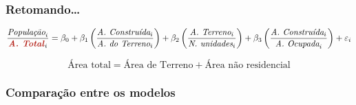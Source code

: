 \documentclass[%
    8pt, 
    aspectratio=169,
]{beamer}
\begin{document}
\begin{frame}
    \frametitle{Retomando\dots}
    \begin{equation*}
        \frac{\textit{População}_i}{\textcolor{BrickRed}{\textbf{\textit{A. Total}}}_i}
        =\beta_0
        +\beta_1\left(\frac{\textit{A. Construída}_i}{\textit{A. do Terreno}_i}\right)
        +\beta_2\left(\frac{\textit{A. Terreno}_i}{\textit{N. unidades}_i}\right)
        +\beta_3\left(\frac{\textit{A. Construída}_i}{\textit{A. Ocupada}_i}\right)
        +\varepsilon_i
    \end{equation*}

    \vspace{50pt}

    \begin{equation*}
        \text{Área total} = \text{Área de Terreno} + \text{Área não residencial}
    \end{equation*}

\end{frame}

\begin{frame}
    \frametitle{Comparação entre os modelos}
    \centering

    \begin{table}
        \centering
        \caption{Resultados utilizando área residencial para calcular a densidade}
    \end{table}

    \vspace{10pt}

    \begin{table}
        \centering
        \caption{Resultados utilizando área total para calcular a densidade}
    \end{table}
    
    
\end{frame}
\end{document}
